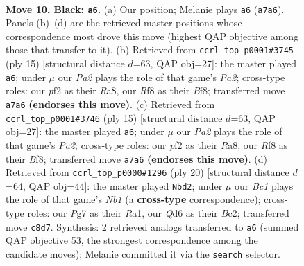 \documentclass[11pt]{article}
\begin{document}
\clearpage

\begin{figure}[p]\centering
\begin{subfigure}{0.46\textwidth}\centering
\resizebox{\linewidth}{!}{%
\newchessgame
\chessboard[
  setfen={rnb2rk1/ppp1bppp/1n1qp3/4N3/2pP4/4B1P1/PP2PPBP/RN1Q1RK1 b - - 7 10},
  showmover=false,
  pgfstyle=straightmove, color=movearrow, markmove={a7-a6}
]}
\caption{}
\end{subfigure}\hfill
\begin{subfigure}{0.46\textwidth}\centering
\resizebox{\linewidth}{!}{%
\newchessgame
\chessboard[
  setfen={rn1qkb1r/pb3ppp/2p1pn2/1p2N3/P1pP4/6P1/1P2PPBP/RNBQ1RK1 b kq - 0 8},
  showmover=false,
  pgfstyle=straightmove, color=movearrow, markmove={a7-a6}
]}
\caption{}
\end{subfigure}
\\[4pt]
\begin{subfigure}{0.46\textwidth}\centering
\resizebox{\linewidth}{!}{%
\newchessgame
\chessboard[
  setfen={rn1qkb1r/pb3ppp/2p1pn2/1p2N3/P1pP4/6P1/1P2PPBP/RNBQ1RK1 b kq - 0 8},
  showmover=false,
  pgfstyle=straightmove, color=movearrow, markmove={a7-a6}
]}
\caption{}
\end{subfigure}\hfill
\begin{subfigure}{0.46\textwidth}\centering
\resizebox{\linewidth}{!}{%
\newchessgame
\chessboard[
  setfen={r2q1rk1/2p2ppp/p1n1b3/1pbpP3/4n3/2P2N2/PPB2PPP/RNBQ1RK1 w - - 3 11},
  showmover=false,
  pgfstyle=straightmove, color=movearrow, markmove={b1-d2}
]}
\caption{}
\end{subfigure}
\caption{\textbf{Move 10, Black: \texttt{a6}.} (a) Our position; Melanie plays \texttt{a6} (\texttt{a7a6}). Panels (b)--(d) are the retrieved master positions whose correspondence most drove this move (highest QAP objective among those that transfer to it). (b) Retrieved from \texttt{ccrl\_top\_p0001\#3745} (ply 15) [structural distance $d$=63, QAP obj=27]: the master played \texttt{a6}; under $\mu$ our \emph{Pa2} plays the role of that game's \emph{Pa2}; cross-type roles: our \emph{p}f2 as their \emph{R}a8, our \emph{R}f8 as their \emph{B}f8; transferred move \texttt{a7a6} \textbf{(endorses this move)}. (c) Retrieved from \texttt{ccrl\_top\_p0001\#3746} (ply 15) [structural distance $d$=63, QAP obj=27]: the master played \texttt{a6}; under $\mu$ our \emph{Pa2} plays the role of that game's \emph{Pa2}; cross-type roles: our \emph{p}f2 as their \emph{R}a8, our \emph{R}f8 as their \emph{B}f8; transferred move \texttt{a7a6} \textbf{(endorses this move)}. (d) Retrieved from \texttt{ccrl\_top\_p0000\#1296} (ply 20) [structural distance $d$=64, QAP obj=44]: the master played \texttt{Nbd2}; under $\mu$ our \emph{Bc1} plays the role of that game's \emph{Nb1} (a \textbf{cross-type} correspondence); cross-type roles: our \emph{P}g7 as their \emph{R}a1, our \emph{Q}d6 as their \emph{B}c2; transferred move \texttt{c8d7}. Synthesis: 2 retrieved analogs transferred to \texttt{a6} (summed QAP objective 53, the strongest correspondence among the candidate moves); Melanie committed it via the \texttt{search} selector.}
\label{fig:thought-m19}
\end{figure}
\end{document}
